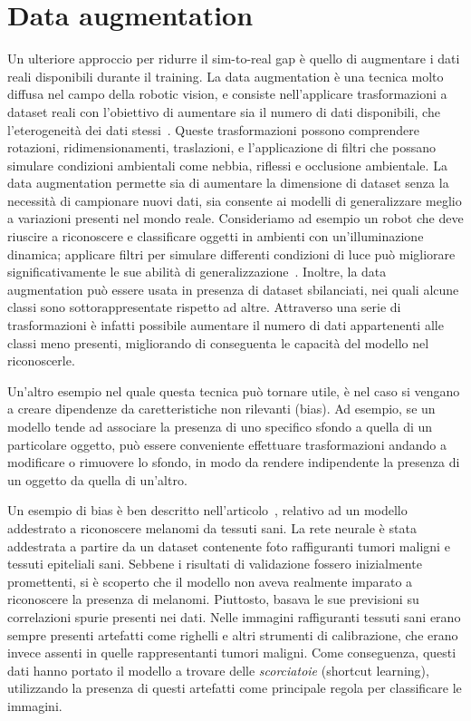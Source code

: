 \documentclass[12pt]{report}
\begin{document}
\section{Data augmentation}
\label{sec:augmentation}

Un ulteriore approccio per ridurre il sim-to-real gap è quello di augmentare i dati reali disponibili durante il training. La data augmentation è una tecnica molto diffusa nel campo della robotic vision, e consiste nell'applicare trasformazioni a dataset reali con l'obiettivo di aumentare sia il numero di dati disponibili, che l'eterogeneità dei dati stessi~\cite{Shorten2019}. Queste trasformazioni possono comprendere rotazioni, ridimensionamenti, traslazioni, e l'applicazione di filtri che possano simulare condizioni ambientali come nebbia, riflessi e occlusione ambientale. La data augmentation permette sia di aumentare la dimensione di dataset senza la necessità di campionare nuovi dati, sia consente ai modelli di generalizzare meglio a variazioni presenti nel mondo reale. Consideriamo ad esempio un robot che deve riuscire a riconoscere e classificare oggetti in ambienti con un'illuminazione dinamica; applicare filtri per simulare differenti condizioni di luce può migliorare significativamente le sue abilità di generalizzazione~\cite{NEURIPS2021_fb4c4860}. Inoltre, la data augmentation può essere usata in presenza di dataset sbilanciati, nei quali alcune classi sono sottorappresentate rispetto ad altre. Attraverso una serie di trasformazioni è infatti possibile aumentare il numero di dati appartenenti alle classi meno presenti, migliorando di conseguenta le capacità del modello nel riconoscerle.

Un'altro esempio nel quale questa tecnica può tornare utile, è nel caso si vengano a creare dipendenze da caretteristiche non rilevanti (bias). Ad esempio, se un modello tende ad associare la presenza di uno specifico sfondo a quella di un particolare oggetto, può essere conveniente effettuare trasformazioni andando a modificare o rimuovere lo sfondo, in modo da rendere indipendente la presenza di un oggetto da quella di un'altro.

Un esempio di bias è ben descritto nell'articolo~\cite{diagnostics12010040}, relativo ad un modello addestrato a riconoscere melanomi da tessuti sani. La rete neurale è stata addestrata a partire da un dataset contenente foto raffiguranti tumori maligni e tessuti epiteliali sani. Sebbene i risultati di validazione fossero inizialmente promettenti, si è scoperto che il modello non aveva realmente imparato a riconoscere la presenza di melanomi. Piuttosto, basava le sue previsioni su correlazioni spurie presenti nei dati. Nelle immagini raffiguranti tessuti sani erano sempre presenti artefatti come righelli e altri strumenti di calibrazione, che erano invece assenti in quelle rappresentanti tumori maligni. Come conseguenza, questi dati hanno portato il modello a trovare delle \textit{scorciatoie} (shortcut learning), utilizzando la presenza di questi artefatti come principale regola per classificare le immagini.
\end{document}
